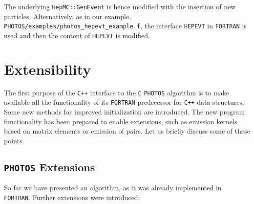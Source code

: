 \documentclass[]{Photos_interface_design}
\begin{document}
The underlying {\tt HepMC::GenEvent} is hence modified with the insertion of new particles.
Alternatively, as in our example, {\tt PHOTOS/examples/photos\_hepevt\_example.f}, the interface {\tt HEPEVT} in {\tt FORTRAN} is used 
and then the content of  {\tt HEPEVT} is modified.

\section{Extensibility}
\label{sec:extensibility}
 The first purpose of the {\tt C++} interface to the {\tt C} {\tt PHOTOS} algorithm is to make available 
all the functionality of its {\tt FORTRAN} predecessor for 
{\tt C++} data
structures. Some new methods for improved initialization are introduced. The new program 
functionality has been prepared to enable extensions, such as emission kernels based on matrix elements
or emission of pairs. 
Let us briefly discuss some of these points.

\subsection{{\tt PHOTOS} Extensions}
So far  we have presented an algorithm, as it was 
already implemented in {\tt FORTRAN}. Further extensions were introduced:  
\end{document}
